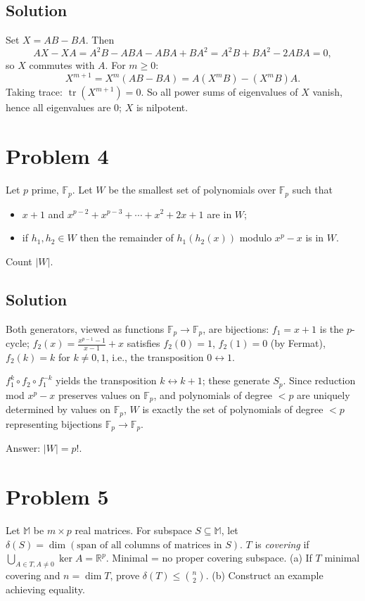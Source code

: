\documentclass{article}
\begin{document}
\subsection*{Solution}
Set $X = AB - BA$. Then
\[
AX - XA = A^2 B - ABA - ABA + BA^2 = A^2 B + BA^2 - 2ABA = 0,
\]
so $X$ commutes with $A$. For $m \ge 0$:
\[
X^{m+1} = X^m(AB - BA) = A(X^m B) - (X^m B)A.
\]
Taking trace: $\operatorname{tr}(X^{m+1}) = 0$. So all power sums of eigenvalues of $X$ vanish, hence all eigenvalues are $0$; $X$ is nilpotent.

\section*{Problem 4}
Let $p$ prime, $\mathbb{F}_p$. Let $W$ be the smallest set of polynomials over $\mathbb{F}_p$ such that
\begin{itemize}
  \item $x + 1$ and $x^{p-2} + x^{p-3} + \cdots + x^2 + 2x + 1$ are in $W$;
  \item if $h_1, h_2 \in W$ then the remainder of $h_1(h_2(x))$ modulo $x^p - x$ is in $W$.
\end{itemize}
Count $|W|$.

\subsection*{Solution}
Both generators, viewed as functions $\mathbb{F}_p \to \mathbb{F}_p$, are bijections: $f_1 = x + 1$ is the $p$-cycle; $f_2(x) = \tfrac{x^{p-1} - 1}{x - 1} + x$ satisfies $f_2(0) = 1$, $f_2(1) = 0$ (by Fermat), $f_2(k) = k$ for $k \ne 0, 1$, i.e., the transposition $0 \leftrightarrow 1$.

$f_1^k \circ f_2 \circ f_1^{-k}$ yields the transposition $k \leftrightarrow k+1$; these generate $S_p$. Since reduction mod $x^p - x$ preserves values on $\mathbb{F}_p$, and polynomials of degree $< p$ are uniquely determined by values on $\mathbb{F}_p$, $W$ is exactly the set of polynomials of degree $< p$ representing bijections $\mathbb{F}_p \to \mathbb{F}_p$.

Answer: $|W| = p!$.

\section*{Problem 5}
Let $\mathbb{M}$ be $m \times p$ real matrices. For subspace $S \subseteq \mathbb{M}$, let $\delta(S) = \dim(\text{span of all columns of matrices in } S)$. $T$ is \emph{covering} if $\bigcup_{A \in T, A \ne 0} \ker A = \mathbb{R}^p$. Minimal = no proper covering subspace.
(a) If $T$ minimal covering and $n = \dim T$, prove $\delta(T) \le \binom{n}{2}$.
(b) Construct an example achieving equality.
\end{document}
